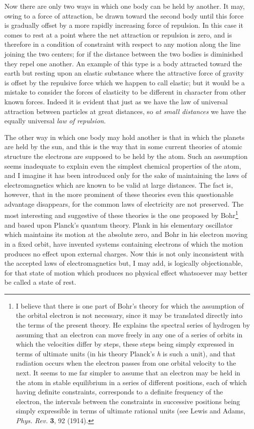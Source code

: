 \documentclass[11pt]{memoir}
\begin{document}
Now there are only two ways in which one body can be held by another.  It may, owing to a force of attraction, be drawn toward the second body until this force is gradually offset by a more rapidly increasing force of repulsion.  In this case it comes to rest at a point where the net attraction or repulsion is zero, and is therefore in a condition of constraint with respect to any motion along the line joining the two centers; for if the distance between the two bodies is diminished they repel one another.  An example of this type is a body attracted toward the earth but resting upon an elastic substance where the attractive force of gravity is offset by the repulsive force which we happen to call elastic; but it would be a mistake to consider the forces of elasticity to be different in character from other known forces.  Indeed it is evident that just as we have the law of universal attraction between particles at great distances, so \emph{at small distances} we have the equally universal \emph{law of repulsion}.

The other way in which one body may hold another is that in which the planets are held by the sun, and this is the way that in some current theories of atomic structure the electrons are supposed to be held by the atom.  Such an assumption seems inadequate to explain even the simplest chemical properties of the atom, and I imagine it has been introduced only for the sake of maintaining the laws of electromagnetics which are known to be valid at large distances.  The fact is, however, that in the more prominent of these theories even this questionable advantage disappears, for the common laws of electricity are not preserved.  The most interesting and suggestive of these theories is the one proposed by Bohr\footnote{I believe that there is one part of Bohr's theory for which the assumption of the orbital electron is not necessary, since it may be translated directly into the terms of the present theory.  He explains the spectral series of hydrogen by assuming that an electron can move freely in any one of a series of orbits in which the velocities differ by steps, these steps being simply expressed in terms of ultimate units (in his theory Planck's \emph{h} is such a unit), and that radiation occurs when the electron passes from one orbital velocity to the next.  It seems to me far simpler to assume that an electron may be held in the atom in stable equilibrium in a series of different positions, each of which having definite constraints, corresponds to a definite frequency of the electron, the intervals between the constraints in successive positions being simply expressible in terms of ultimate rational units (see Lewis and Adams, \emph{Phys. Rev.} \textbf{3}, 92 (1914).} and based upon Planck's quantum theory.  Plank in his elementary oscillator which maintains its motion at the absolute zero, and Bohr in his electron moving in a fixed orbit, have invented systems containing electrons of which the motion produces no effect upon external charges.  Now this is not only inconsistent with the accepted laws of electromagnetics but, I may add, is logically objectionable, for that state of motion which produces no physical effect whatsoever may better be called a state of rest.
\end{document}
